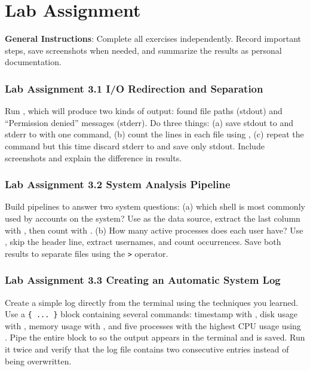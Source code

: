 \section{Lab Assignment}

\textbf{General Instructions}: Complete all exercises independently. Record important steps, save screenshots when needed, and summarize the results as personal documentation.

\subsubsection*{Lab Assignment 3.1 I/O Redirection and Separation}
Run , which will produce two kinds of output: found file paths (stdout) and ``Permission denied'' messages (stderr). Do three things: (a) save stdout to  and stderr to  with one command, (b) count the lines in each file using , (c) repeat the command but this time discard stderr to  and save only stdout. Include screenshots and explain the difference in results.


\subsubsection*{Lab Assignment 3.2 System Analysis Pipeline}
Build pipelines to answer two system questions: (a) which shell is most commonly used by accounts on the system? Use  as the data source, extract the last column with , then count with . (b) How many active processes does each user have? Use , skip the header line, extract usernames, and count occurrences. Save both results to separate files using the \texttt{>} operator.


\subsubsection*{Lab Assignment 3.3 Creating an Automatic System Log}
Create a simple log directly from the terminal using the techniques you learned. Use a \texttt{\{ ... \}} block containing several commands: timestamp with , disk usage with , memory usage with , and five processes with the highest CPU usage using . Pipe the entire block to  so the output appears in the terminal and is saved. Run it twice and verify that the log file contains two consecutive entries instead of being overwritten.


%
